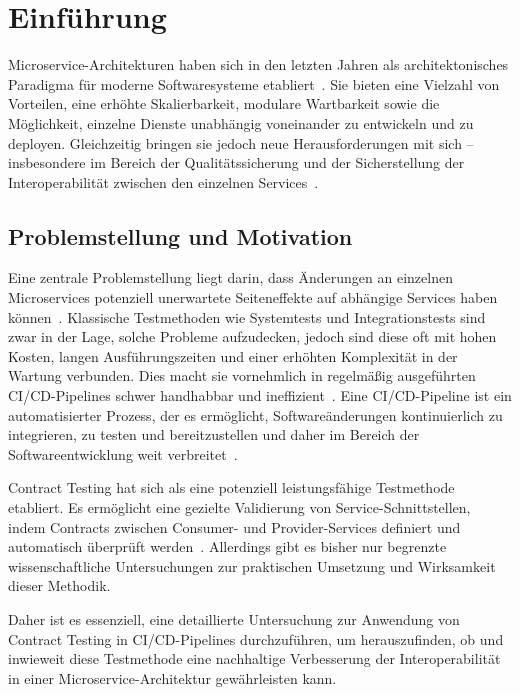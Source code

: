 \chapter{Einführung}\label{ch:intro}

Microservice-Architekturen haben sich in den letzten Jahren als architektonisches Paradigma für moderne Softwaresysteme etabliert~\cite{haroMicroserviceAPIs2023}.
Sie bieten eine Vielzahl von Vorteilen, \zB eine erhöhte Skalierbarkeit, modulare Wartbarkeit sowie die Möglichkeit, einzelne Dienste unabhängig voneinander zu entwickeln und zu deployen.
Gleichzeitig bringen sie jedoch neue Herausforderungen mit sich – insbesondere im Bereich der Qualitätssicherung und der Sicherstellung der Interoperabilität zwischen den einzelnen Services~\cite{newmanMonolithMicroservices2019}.

\section{Problemstellung und Motivation}\label{sec:intro_problem}

Eine zentrale Problemstellung liegt darin, dass Änderungen an einzelnen Microservices potenziell unerwartete Seiteneffekte auf abhängige Services haben können~\cite{clemsonTestingStrategiesMicroservice2014}.
Klassische Testmethoden wie Systemtests und Integrationstests sind zwar in der Lage, solche Probleme aufzudecken, jedoch sind diese oft mit hohen Kosten, langen Ausführungszeiten und einer erhöhten Komplexität in der Wartung verbunden.
Dies macht sie vornehmlich in regelmäßig ausgeführten \gls{CI}/\gls{CD}-\glspl{Pipeline} schwer handhabbar und ineffizient~\cite{singhSoftwareTesting2011}.
Eine \gls{CI}/\gls{CD}-\gls{Pipeline} ist ein automatisierter Prozess, der es ermöglicht, Softwareänderungen kontinuierlich zu integrieren, zu testen und bereitzustellen und daher im Bereich der Softwareentwicklung weit verbreitet~\cite{duvallContinuousIntegrationImproving2007}.

Contract Testing hat sich als eine potenziell leistungsfähige Testmethode etabliert.
Es ermöglicht eine gezielte Validierung von Service-Schnittstellen, indem Contracts zwischen Consumer- und Provider-Services definiert und automatisch überprüft werden~\cite{cruzContractTestingAction2025}.
Allerdings gibt es bisher nur begrenzte wissenschaftliche Untersuchungen zur praktischen Umsetzung und Wirksamkeit dieser Methodik.

Daher ist es essenziell, eine detaillierte Untersuchung zur Anwendung von Contract Testing in \gls{CI}/\gls{CD}-\glspl{Pipeline} durchzuführen, um herauszufinden, ob und inwieweit diese Testmethode eine nachhaltige Verbesserung der Interoperabilität in einer Microservice-Architektur gewährleisten kann.

